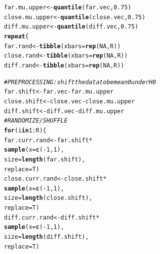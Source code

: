 \documentclass{article}\usepackage[]{graphicx}\usepackage[]{xcolor}
\makeatletter
\newcommand{\hlnum}[1]{\textcolor[rgb]{0.686,0.059,0.569}{#1}}%
\newcommand{\hlcom}[1]{\textcolor[rgb]{0.678,0.584,0.686}{\textit{#1}}}%
\newcommand{\hlopt}[1]{\textcolor[rgb]{0,0,0}{#1}}%
\newcommand{\hldef}[1]{\textcolor[rgb]{0.345,0.345,0.345}{#1}}%
\newcommand{\hlkwa}[1]{\textcolor[rgb]{0.161,0.373,0.58}{\textbf{#1}}}%
\newcommand{\hlkwb}[1]{\textcolor[rgb]{0.69,0.353,0.396}{#1}}%
\newcommand{\hlkwc}[1]{\textcolor[rgb]{0.333,0.667,0.333}{#1}}%
\newcommand{\hlkwd}[1]{\textcolor[rgb]{0.737,0.353,0.396}{\textbf{#1}}}%
\newenvironment{kframe}{%
 \def\at@end@of@kframe{}%
 \ifinner\ifhmode%
  \def\at@end@of@kframe{\end{minipage}}%
  \begin{minipage}{\columnwidth}%
 \fi\fi%
 \def\FrameCommand##1{\hskip\@totalleftmargin \hskip-\fboxsep
 \colorbox{shadecolor}{##1}\hskip-\fboxsep
     \hskip-\linewidth \hskip-\@totalleftmargin \hskip\columnwidth}%
 \MakeFramed {\advance\hsize-\width
   \@totalleftmargin\z@ \linewidth\hsize
   \@setminipage}}%
 {\par\unskip\endMakeFramed%
 \at@end@of@kframe}
\newenvironment{knitrout}{}{} %
\makeatother
\begin{document}
\begin{enumerate}
\begin{enumerate}
\begin{knitrout}
\begin{kframe}
\begin{alltt}
\hldef{far.mu.upper} \hlkwb{<-} \hlkwd{quantile}\hldef{(far.vec,} \hlnum{0.75}\hldef{)}
\hldef{close.mu.upper} \hlkwb{<-} \hlkwd{quantile}\hldef{(close.vec,} \hlnum{0.75}\hldef{)}
\hldef{diff.mu.upper} \hlkwb{<-} \hlkwd{quantile}\hldef{(diff.vec,} \hlnum{0.75}\hldef{)}
\hlkwa{repeat}\hldef{\{}
  \hldef{far.rand} \hlkwb{<-} \hlkwd{tibble}\hldef{(}\hlkwc{xbars} \hldef{=} \hlkwd{rep}\hldef{(}\hlnum{NA}\hldef{, R))}
  \hldef{close.rand} \hlkwb{<-} \hlkwd{tibble}\hldef{(}\hlkwc{xbars} \hldef{=} \hlkwd{rep}\hldef{(}\hlnum{NA}\hldef{, R))}
  \hldef{diff.rand} \hlkwb{<-} \hlkwd{tibble}\hldef{(}\hlkwc{xbars} \hldef{=} \hlkwd{rep}\hldef{(}\hlnum{NA}\hldef{, R))}

  \hlcom{# PREPROCESSING: shift the data to be mean 0 under H0}
  \hldef{far.shift} \hlkwb{<-} \hldef{far.vec} \hlopt{-} \hldef{far.mu.upper}
  \hldef{close.shift} \hlkwb{<-} \hldef{close.vec} \hlopt{-} \hldef{close.mu.upper}
  \hldef{diff.shift} \hlkwb{<-} \hldef{diff.vec} \hlopt{-} \hldef{diff.mu.upper}
  \hlcom{# RANDOMIZE / SHUFFLE}
  \hlkwa{for}\hldef{(i} \hlkwa{in} \hlnum{1}\hlopt{:}\hldef{R)\{}
    \hldef{far.curr.rand} \hlkwb{<-} \hldef{far.shift} \hlopt{*}
      \hlkwd{sample}\hldef{(}\hlkwc{x} \hldef{=} \hlkwd{c}\hldef{(}\hlopt{-}\hlnum{1}\hldef{,} \hlnum{1}\hldef{),}
             \hlkwc{size} \hldef{=} \hlkwd{length}\hldef{(far.shift),}
             \hlkwc{replace} \hldef{= T)}
    \hldef{close.curr.rand} \hlkwb{<-} \hldef{close.shift} \hlopt{*}
      \hlkwd{sample}\hldef{(}\hlkwc{x} \hldef{=} \hlkwd{c}\hldef{(}\hlopt{-}\hlnum{1}\hldef{,} \hlnum{1}\hldef{),}
             \hlkwc{size} \hldef{=} \hlkwd{length}\hldef{(close.shift),}
             \hlkwc{replace} \hldef{= T)}
    \hldef{diff.curr.rand} \hlkwb{<-} \hldef{diff.shift} \hlopt{*}
      \hlkwd{sample}\hldef{(}\hlkwc{x} \hldef{=} \hlkwd{c}\hldef{(}\hlopt{-}\hlnum{1}\hldef{,} \hlnum{1}\hldef{),}
             \hlkwc{size} \hldef{=} \hlkwd{length}\hldef{(diff.shift),}
             \hlkwc{replace} \hldef{= T)}


\end{alltt}
\end{kframe}
\end{knitrout}
\end{enumerate}
\end{enumerate}
\end{document}
